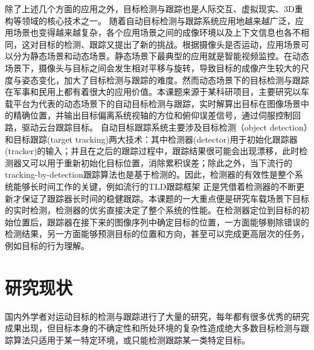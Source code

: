 除了上述几个方面的应用之外，目标检测与跟踪也是人际交互、虚拟现实、3D重构等领域的核心技术之一。
随着自动目标检测与跟踪系统应用地越来越广泛，应用场景也变得越来越复杂，各个应用场景之间的成像环境以及上下文信息也各不相同，这对目标的检测、跟踪又提出了新的挑战。根据摄像头是否运动，应用场景可以分为静态场景和动态场景。静态场景下最典型的应用就是智能视频监控。在动态场景下，摄像头与目标之间会发生相对平移与旋转，导致目标的成像产生较大的尺度与姿态变化，加大了目标检测与跟踪的难度。然而动态场景下的目标检测与跟踪在军事和民用上都有着很大的应用价值。本课题来源于某科研项目，主要研究以车载平台为代表的动态场景下的自动目标检测与跟踪，实时解算出目标在图像场景中的精确位置，并输出目标偏离系统视轴的方位和俯仰误差信号，通过伺服控制回路，驱动云台跟踪目标。
自动目标跟踪系统主要涉及目标检测（object detection）和目标跟踪(target tracking)两大技术：其中检测器(detector)用于初始化跟踪器(tracker)的输入；并且在之后的跟踪过程中，跟踪结果很可能会出现漂移，此时检测器又可以用于重新初始化目标位置，消除累积误差；除此之外，当下流行的tracking-by-detection跟踪算法也是基于检测的。因此，检测器的有效性是整个系统能够长时间工作的关键，例如流行的TLD跟踪框架 \cite{tld} 正是凭借着检测器的不断更新才保证了跟踪器长时间的稳健跟踪。本课题的一大重点便是研究车载场景下目标的实时检测，检测器的优劣直接决定了整个系统的性能。在检测器定位到目标的初始位置后，跟踪器在接下来的图像序列中确定目标的位置，一方面能够剔除错误的检测结果，另一方面能够预测目标的位置和方向，甚至可以完成更高层次的任务，例如目标的行为理解。

\section{研究现状}
国内外学者对运动目标的检测与跟踪进行了大量的研究，每年都有很多优秀的研究成果出现，但目标本身的不确定性和所处环境的复杂性造成绝大多数目标检测与跟踪算法只适用于某一特定环境，或只能检测跟踪某一类特定目标。
